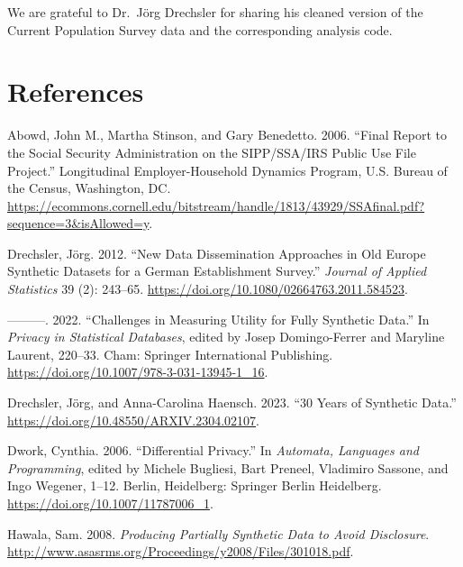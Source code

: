 \documentclass[
]{template/style/uneceart}
\newlength{\cslhangindent}
\newlength{\cslentryspacingunit} %
\newenvironment{CSLReferences}[2] %
 {%
  \setlength{\parindent}{0pt}
  \ifodd #1
  \let\oldpar\par
  \def\par{\hangindent=\cslhangindent\oldpar}
  \fi
  \setlength{\parskip}{#2\cslentryspacingunit}
 }%
 {}
\begin{document}
We are grateful to Dr.~Jörg Drechsler for sharing his cleaned version of
the Current Population Survey data and the corresponding analysis code.

\hypertarget{references}{%
\section{References}\label{references}}

\hypertarget{refs}{}
\begin{CSLReferences}{1}{0}
\leavevmode{}%
Abowd, John M., Martha Stinson, and Gary Benedetto. 2006. {``Final
Report to the Social Security Administration on the {SIPP/SSA/IRS}
Public Use File Project.''} Longitudinal Employer-Household Dynamics
Program, U.S. Bureau of the Census, Washington, DC.
\url{https://ecommons.cornell.edu/bitstream/handle/1813/43929/SSAfinal.pdf?sequence=3\&isAllowed=y}.

\leavevmode{}%
Drechsler, Jörg. 2012. {``New Data Dissemination Approaches in Old
Europe {\textendash} Synthetic Datasets for a German Establishment
Survey.''} \emph{Journal of Applied Statistics} 39 (2): 243--65.
\url{https://doi.org/10.1080/02664763.2011.584523}.

\leavevmode{}%
---------. 2022. {``Challenges in Measuring Utility for Fully Synthetic
Data.''} In \emph{Privacy in Statistical Databases}, edited by Josep
Domingo-Ferrer and Maryline Laurent, 220--33. Cham: Springer
International Publishing.
\url{https://doi.org/10.1007/978-3-031-13945-1_16}.

\leavevmode{}%
Drechsler, Jörg, and Anna-Carolina Haensch. 2023. {``30 Years of
Synthetic Data.''} \url{https://doi.org/10.48550/ARXIV.2304.02107}.

\leavevmode{}%
Dwork, Cynthia. 2006. {``Differential Privacy.''} In \emph{Automata,
Languages and Programming}, edited by Michele Bugliesi, Bart Preneel,
Vladimiro Sassone, and Ingo Wegener, 1--12. Berlin, Heidelberg: Springer
Berlin Heidelberg. \url{https://doi.org/10.1007/11787006_1}.

\leavevmode{}%
Hawala, Sam. 2008. \emph{Producing Partially Synthetic Data to Avoid
Disclosure}.
\url{http://www.asasrms.org/Proceedings/y2008/Files/301018.pdf}.


\end{CSLReferences}
\end{document}
